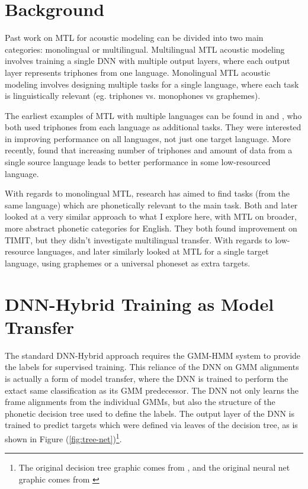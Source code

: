 \documentclass[a4paper]{article}
\begin{document}
\section{Background}

Past work on MTL for acoustic modeling can be divided into two main categories: monolingual or multilingual. Multilingual MTL acoustic modeling involves training a single DNN with multiple output layers, where each output layer represents triphones from one language. Monolingual MTL acoustic modeling involves designing multiple tasks for a single language, where each task is linguistically relevant (eg. triphones vs. monophones vs graphemes). 

The earliest examples of MTL with multiple languages can be found in \cite{huang2013} and \cite{heigold2013}, who both used triphones from each language as additional tasks. They were interested in improving performance on all languages, not just one target language. More recently, \cite{grezl2016} found that increasing number of triphones and amount of data from a single source language leads to better performance in some low-resourced language.


With regards to monolingual MTL, research has aimed to find tasks (from the same language) which are phonetically relevant to the main task. Both \cite{seltzer2013} and later \cite{huang2015} looked at a very similar approach to what I explore here, with MTL on broader, more abstract phonetic categories for English. They both found improvement on TIMIT, but they didn't investigate multilingual transfer. With regards to low-resource languages, \cite{chen2014} and later \cite{chen2015} similarly looked at MTL for a single target language, using graphemes or a universal phoneset as extra targets.



\section{DNN-Hybrid Training as Model Transfer}

The standard DNN-Hybrid approach requires the GMM-HMM system to provide the labels for supervised training. This reliance of the DNN on GMM alignments is actually a form of model transfer, where the DNN is trained to perform the extact same classification as its GMM predecessor. The DNN not only learns the frame alignments from the individual GMMs, but also the structure of the phonetic decision tree used to define the labels. The output layer of the DNN is trained to predict targets which were defined via leaves of the decision tree, as is shown in Figure (\ref{fig:tree-net})\footnote{The original decision tree graphic comes from \cite{young2002}, and the original neural net graphic comes from \cite{heigold2013}}.
\end{document}

